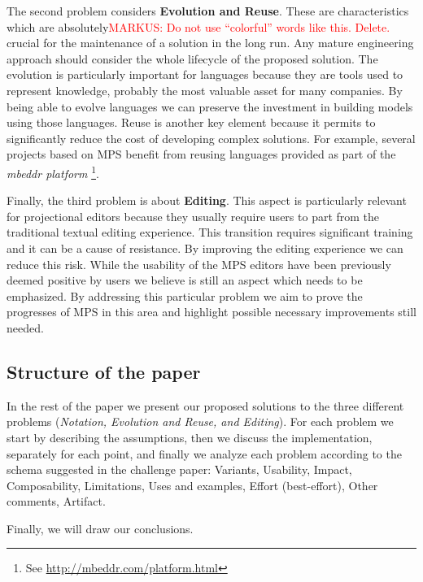 \documentclass[preprint,numbers,10pt]{sigplanconf}
\newcommand\markus[1]{\textcolor{red}{MARKUS: {#1}}}
\begin{document}
The second problem considers \textbf{Evolution and Reuse}. These are
characteristics which are absolutely\markus{Do not use ``colorful'' words like
this. Delete.} crucial for the maintenance of a solution in the long run. Any
mature engineering approach should consider the whole lifecycle of the proposed
solution. The evolution is particularly important for languages because they are
tools used to represent knowledge, probably the most valuable asset for many
companies. By being able to evolve languages we can preserve the investment 
in building models using those languages. Reuse is another key element because
it permits to significantly reduce the cost of developing complex solutions. For
example, several projects based on MPS benefit from reusing languages provided
as part of the \emph{mbeddr platform} \footnote{See
\url{http://mbeddr.com/platform.html}}.

Finally, the third problem is about \textbf{Editing}. This aspect is
particularly relevant for projectional editors because they usually require
users to part from the traditional textual editing experience. This transition
requires significant training and it can be a cause of resistance. By improving
the editing experience we can reduce this risk. While the usability of the MPS
editors have been previously deemed positive by users \cite{Voelter2014} we
believe is still an aspect which needs to be emphasized. By addressing this
particular problem we aim to prove the progresses of MPS in this area and
highlight possible necessary improvements still needed.

\subsection{Structure of the paper}

In the rest of the paper we present our proposed solutions to the
three different problems (\emph{Notation, Evolution and Reuse, and Editing}).
For each problem we start by describing the assumptions, then we
discuss the implementation, separately for each point, and finally we
analyze each problem according to the schema suggested in the challenge
paper\cite{REFERENCE?}:
Variants, Usability, Impact, Composability, Limitations, Uses and examples, Effort (best-effort), Other
comments, Artifact.

Finally, we will draw our conclusions.

%
%
\end{document}
